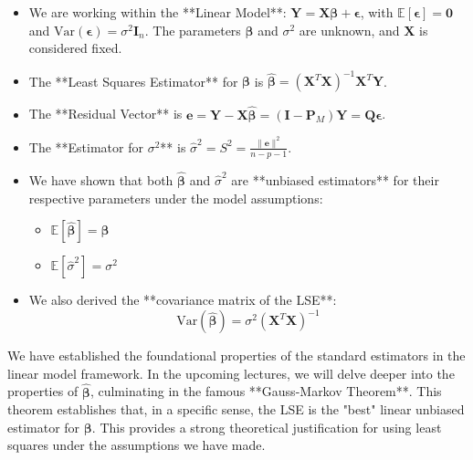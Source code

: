 \documentclass[11pt, letterpaper]{article}
\theoremstyle{definition}
\newcommand{\E}{\mathbb{E}}
\newcommand{\Var}{\text{Var}}
\newcommand{\mat}[1]{\mathbf{#1}} %
\newcommand{\vect}[1]{\boldsymbol{#1}} %
\newcommand{\T}{^T} %
\begin{document}
\begin{itemize}
    \item We are working within the **Linear Model**: $\vect{Y} = \mat{X}\vect{\beta} + \vect{\epsilon}$, with $\E[\vect{\epsilon}] = \vect{0}$ and $\Var(\vect{\epsilon}) = \sigma^2 \mat{I}_n$. The parameters $\vect{\beta}$ and $\sigma^2$ are unknown, and $\mat{X}$ is considered fixed.
    \item The **Least Squares Estimator** for $\vect{\beta}$ is $\hat{\vect{\beta}} = (\mat{X}\T \mat{X})^{-1} \mat{X}\T \vect{Y}$.
    \item The **Residual Vector** is $\vect{e} = \vect{Y} - \mat{X}\hat{\vect{\beta}} = (\mat{I} - \mat{P}_M)\vect{Y} = \mat{Q}\vect{\epsilon}$.
    \item The **Estimator for $\sigma^2$** is $\hat{\sigma}^2 = S^2 = \frac{\|\vect{e}\|^2}{n-p-1}$.
    \item We have shown that both $\hat{\vect{\beta}}$ and $\hat{\sigma}^2$ are **unbiased estimators** for their respective parameters under the model assumptions:
        \begin{itemize}
            \item $\E[\hat{\vect{\beta}}] = \vect{\beta}$
            \item $\E[\hat{\sigma}^2] = \sigma^2$
        \end{itemize}
    \item We also derived the **covariance matrix of the LSE**:
        \[ \Var(\hat{\vect{\beta}}) = \sigma^2 (\mat{X}\T \mat{X})^{-1} \]
\end{itemize}

We have established the foundational properties of the standard estimators in the linear model framework. In the upcoming lectures, we will delve deeper into the properties of $\hat{\vect{\beta}}$, culminating in the famous **Gauss-Markov Theorem**. This theorem establishes that, in a specific sense, the LSE is the "best" linear unbiased estimator for $\vect{\beta}$. This provides a strong theoretical justification for using least squares under the assumptions we have made.
\end{document}
